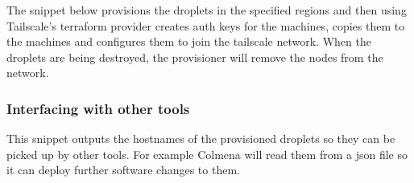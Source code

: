 The snippet below provisions the droplets in the specified regions and
then using Tailscale's terraform provider creates auth keys for the
machines, copies them to the machines and configures them to join the
tailscale network. When the droplets are being destroyed, the
provisioner will remove the nodes from the network.

\begin{Shaded}
\begin{Highlighting}[]


\NormalTok{  \}}

\NormalTok{    inline = [}
\NormalTok{    ]}
\NormalTok{  \}}

\NormalTok{    inline = [}
\NormalTok{    ]}
\NormalTok{  \}}

\NormalTok{    replace\_triggered\_by = [}
\NormalTok{    ]}
\NormalTok{  \}}
\NormalTok{\}}

\NormalTok{\}}
\end{Highlighting}
\end{Shaded}

\hypertarget{interfacing-with-other-tools}{%
\subsubsection{Interfacing with other
tools}\label{interfacing-with-other-tools}}

This snippet outputs the hostnames of the provisioned droplets so they
can be picked up by other tools. For example Colmena will read them from
a json file so it can deploy further software changes to them.

